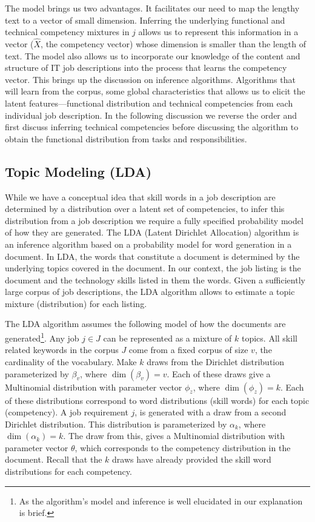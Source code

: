 \documentclass{article}
\begin{document}
The model brings us two advantages. It facilitates our need to map the lengthy text to a vector of small dimension. Inferring the underlying functional and technical competency mixtures in $j$ allows us to represent this information in a vector ($\hat{X}$, the competency vector) whose dimension is smaller than the length of text. The model also allows us to incorporate our knowledge of the content and structure of IT job descriptions into the process that learns the competency vector. This brings up the discussion on inference algorithms. Algorithms that will learn from the corpus, some global characteristics that allows us to elicit the latent features—functional distribution and technical competencies from each individual job description. In the following discussion we reverse the order and first discuss inferring technical competencies before discussing the algorithm to obtain the functional distribution from tasks and responsibilities.


\subsection*{Topic Modeling (LDA)}

While we have a conceptual idea that skill words in a job description are determined by a distribution over a latent set of competencies, to infer this distribution from a job description we require a fully specified probability model of how they are generated. The LDA (Latent Dirichlet Allocation) algorithm \autocite{Blei2003} is an inference algorithm based on a probability model for word generation in a document. In LDA, the words that constitute a document is determined by the underlying topics covered in the document. In our context, the job listing is the document and the technology skills listed in them the words. Given a sufficiently large corpus of job descriptions, the LDA algorithm allows to estimate a topic mixture (distribution) for each listing.

The LDA algorithm assumes the following model of how the documents are generated\footnote{As the algorithm’s model and inference is well elucidated in \autocite{Blei2003} our explanation is brief.}. Any job \( j \in J \) can be represented as a mixture of \( k \) topics. All skill related keywords in the corpus \( J \) come from a fixed corpus of size \( v \), the cardinality of the vocabulary. Make \( k \) draws from the Dirichlet distribution parameterized by \( \beta_v \), where \( \dim(\beta_v) = v \). Each of these draws give a Multinomial distribution with parameter vector \( \phi_{z} \), where \( \dim(\phi_{z}) = k \). Each of these distributions correspond to word distributions (skill words) for each topic (competency). A job requirement \( j \), is generated with a draw from a second Dirichlet distribution. This distribution is parameterized by \( \alpha_k \), where \( \dim(\alpha_k) = k \). The draw from this, gives a Multinomial distribution with parameter vector \( \theta \), which corresponds to the competency distribution in the document. Recall that the \( k \) draws have already provided the skill word distributions for each competency.
\end{document}
